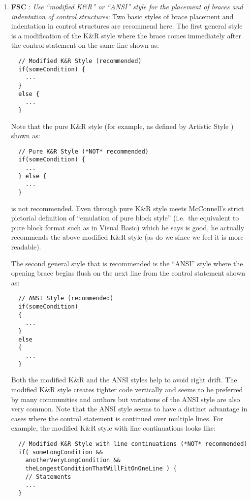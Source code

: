\begin{enumerate}
{}\item{}\textbf{FSC }:
{}\textit{Use ``modified K\&R'' or ``ANSI'' style for the placement of braces
and indentation of control structures}: Two basic styles of brace placement
and indentation in control structures are recommend here.  The first general
style is a modification of the K\&R style{}\cite{ArtisticStyle} where the
brace comes immediately after the control statement on the same line shown as:

{\small\begin{verbatim}
  // Modified K&R Style (recommended)
  if(someCondition) {
    ...
  }
  else {
    ...
  }
\end{verbatim}}

Note that the pure K\&R style (for example, as defined by Artistic Style
{}\cite{ArtisticStyle}) shown as:

{\small\begin{verbatim}
  // Pure K&R Style (*NOT* recommended)
  if(someCondition) {
    ...
  } else {
    ...
  }
\end{verbatim}}

is not recommended.  Even through pure K\&R style meets McConnell's strict
pictorial definition of ``emulation of pure block style'' (i.e.\ the
equivalent to pure block format such as in Visual Basic) which he says is
good, he actually recommends the above modified K\&R style (as do we since we
feel it is more readable).

The second general style that is recommended is the ``ANSI''
style{}\cite{ArtisticStyle} where the opening brace begins flush on the next
line from the control statement shown as:

{\small\begin{verbatim}
  // ANSI Style (recommended)
  if(someCondition)
  {
    ...
  }
  else
  {
    ...
  }
\end{verbatim}}

Both the modified K\&R and the ANSI styles help to avoid right drift.  The
modified K\&R style creates tighter code vertically and seems to be preferred
by many communities and authors but variations of the ANSI style are also very
common.  Note that the ANSI style seems to have a distinct advantage in cases
where the control statement is continued over multiple lines.  For example,
the modified K\&R style with line continuations looks like:

{\small\begin{verbatim}
  // Modified K&R Style with line continuations (*NOT* recommended)
  if( someLongCondition &&
    anotherVeryLongCondition &&
    theLongestConditionThatWillFitOnOneLine ) {
    // Statements
    ...
  }
\end{verbatim}}


\end{enumerate}
